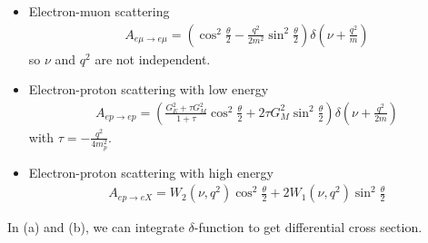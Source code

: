\begin{itemize}
   \item Electron-muon scattering
      \begin{align}
         A_{e\mu \rightarrow e \mu} = \left( \cos^2 \frac{\theta}{2} - \frac{q^2}{2 m^2} \sin^2 \frac{\theta}{2} \right) \delta(\nu + \frac{q^2}{m})
      \end{align}
      so $\nu$ and $q^2$ are not independent.
   \item Electron-proton scattering with low energy
      \begin{align}
         A_{e p \rightarrow e p} = \left( \frac{G_E^2 + \tau G_M^2 }{1 + \tau} \cos^2 \frac{\theta}{2} + 2 \tau G_M^2 \sin^2 \frac{\theta}{2} \right) \delta(\nu + \frac{q^2}{2m} )
      \end{align}
      with $\tau = -\frac{q^2}{4 m_p^2}$.
   \item Electron-proton scattering with high energy
      \begin{align}
         A_{ep \rightarrow e X} = W_2 (\nu, q^2) \cos^2 \frac{\theta}{2} + 2 W_1 (\nu, q^2) \sin^2 \frac{\theta}{2}
      \end{align}
\end{itemize}

In (a) and (b), we can integrate $\delta$-function to get differential cross section.
